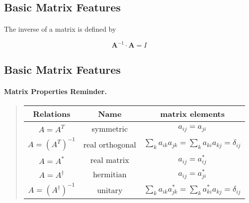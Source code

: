 \documentclass[%
oneside,                 %
final,                   %
10pt]{article}
\begin{document}
\subsection{Basic Matrix Features}

\paragraph{}

The inverse of a matrix is defined by

\[
\mathbf{A}^{-1} \cdot \mathbf{A} = I
\]




\subsection{Basic Matrix Features}


\paragraph{Matrix Properties Reminder.}


\begin{quote}
\begin{tabular}{ccc}
\hline
\multicolumn{1}{c}{ Relations } & \multicolumn{1}{c}{ Name } & \multicolumn{1}{c}{ matrix elements } \\
\hline
$A = A^{T}$                            & symmetric       & $a_{ij} = a_{ji}$                                                       \\
$A = \left (A^{T} \right )^{-1}$       & real orthogonal & $\sum_k a_{ik} a_{jk} = \sum_k a_{ki} a_{kj} = \delta_{ij}$             \\
$A = A^{ * }$                          & real matrix     & $a_{ij} = a_{ij}^{ * }$                                                 \\
$A = A^{\dagger}$                      & hermitian       & $a_{ij} = a_{ji}^{ * }$                                                 \\
$A = \left (A^{\dagger} \right )^{-1}$ & unitary         & $\sum_k a_{ik} a_{jk}^{ * } = \sum_k a_{ki}^{ * } a_{kj} = \delta_{ij}$ \\
\hline
\end{tabular}
\end{quote}

\noindent
\end{document}
